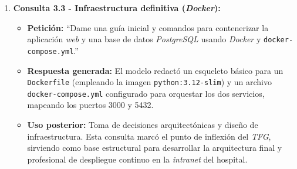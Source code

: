 \begin{itemize}
\begin{enumerate}
        \item \textbf{Consulta 3.3 - Infraestructura definitiva (\textit{Docker}):}
        \begin{itemize}
            \item \textbf{Petición:} ``Dame una guía inicial y comandos para contenerizar la aplicación \textit{web} y una base de datos \textit{PostgreSQL} usando \textit{Docker} y \texttt{docker-compose.yml}.''
            \item \textbf{Respuesta generada:} El modelo redactó un esqueleto básico para un \texttt{Dockerfile} (empleando la imagen \texttt{python:3.12-slim}) y un archivo \texttt{docker-compose.yml} configurado para orquestar los dos servicios, mapeando los puertos 3000 y 5432.
            \item \textbf{Uso posterior:} Toma de decisiones arquitectónicas y diseño de infraestructura. Esta consulta marcó el punto de inflexión del \textit{TFG}, sirviendo como base estructural para desarrollar la arquitectura final y profesional de despliegue continuo en la \textit{intranet} del hospital.
        \end{itemize}
    \end{enumerate}
\end{itemize}


